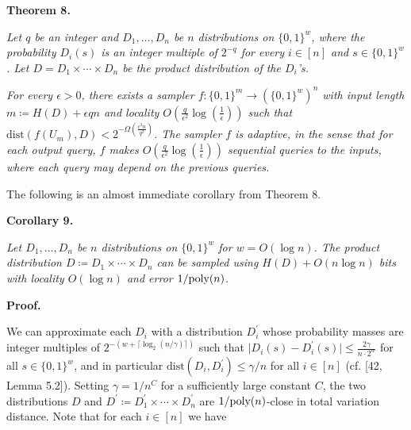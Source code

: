 \par\medskip\noindent\textbf{
\textbf{Theorem 8}\textbf{.}
}\par



\emph{Let $q$ be an integer and $D_{1},\ldots,D_{n}$ be $n$ distributions on $\{0,1\}^{w}$, where the probability $D_{i}(s)$ is an integer multiple of $2^{-q}$ for every $i\in[n]$ and $s\in\{0,1\}^{w}$.
Let $D=D_{1}\times\cdots\times D_{n}$ be the product distribution of the $D_{i}$’s.}\par




\emph{For every $\epsilon>0$, there exists a sampler $f\colon\{0,1\}^{m}\to(\{0,1\}^{w})^{n}$ with input length $m\coloneq H(D)+\epsilon qn$ and locality
$O(\frac{q}{\epsilon^{2}}\log(\frac{1}{\epsilon}))$ such that $\mathrm{dist}(f(U_{m}),D)<2^{-\Omega(\frac{\epsilon^{3}n}{q^{2}})}$.
The sampler $f$ is adaptive, in the sense that for each output query, $f$ makes $O(\frac{q}{\epsilon^{2}}\log(\frac{1}{\epsilon}))$ sequential queries to the inputs, where each query may depend on the previous queries.}\par






The following is an almost immediate corollary from Theorem 8.\par





\par\medskip\noindent\textbf{
\textbf{Corollary 9}\textbf{.}
}\par



\emph{Let $D_{1},\ldots,D_{n}$ be $n$ distributions on $\{0,1\}^{w}$ for $w=O(\log n)$.
The product distribution $D\coloneq D_{1}\times\cdots\times D_{n}$ can be sampled using $H(D)+O(n\log n)$ bits with locality $O(\log n)$ and error $1/\textnormal{poly}(n)$.}\par






\par\medskip\noindent\textbf{Proof.}\par




We can approximate each $D_{i}$ with a distribution $D_{i}^{\prime}$ whose probability masses are integer multiples of $2^{-(w+\lceil\log_{2}(n/\gamma)\rceil)}$ such that $\lvert D_{i}(s)-D^{\prime}_{i}(s)\rvert\leq\frac{2\gamma}{n\cdot 2^{w}}$ for all $s\in\{0,1\}^{w}$, and in particular $\mathrm{dist}(D_{i},D^{\prime}_{i})\leq\gamma/n$ for all $i\in[n]$ (cf. [42, Lemma 5.2]).
Setting $\gamma=1/n^{C}$ for a sufficiently large constant $C$, the two distributions $D$ and $D^{\prime}\coloneq D_{1}^{\prime}\times\cdots\times D_{n}^{\prime}$ are $1/\textnormal{poly}(n)$-close in total variation distance.
Note that for each $i\in[n]$ we have\par



